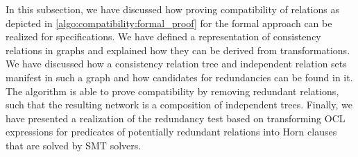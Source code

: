 
In this subsection, we have discussed how proving compatibility of relations as depicted in \autoref{algo:compatibility:formal_proof} for the formal approach can be realized for \qvtr specifications.
We have defined a representation of consistency relations in graphs and explained how they can be derived from \qvtr transformations.
We have discussed how a consistency relation tree and independent relation sets manifest in such a graph and how candidates for redundancies can be found in it. %
The algorithm is able to prove compatibility by removing redundant relations, such that the resulting network is a composition of independent trees.
Finally, we have presented a realization of the redundancy test based on transforming \gls{OCL} expressions for predicates of potentially redundant relations into Horn clauses that are solved by \gls{SMT} solvers.
